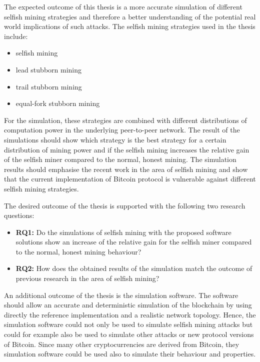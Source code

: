 The expected outcome of this thesis is a more accurate simulation of different selfish mining strategies and therefore a better understanding of the potential real world implications of such attacks.
The selfish mining strategies used in the thesis include:
\begin{itemize}
\item selfish mining \cite{eyal2014majority}
\item lead stubborn mining \cite{nayak2016stubborn}
\item trail stubborn mining \cite{nayak2016stubborn}
\item equal-fork stubborn mining \cite{nayak2016stubborn}
\end{itemize}

For the simulation, these strategies are combined with different distributions of computation power in the underlying peer-to-peer network.
The result of the simulations should show which strategy is the best strategy for a certain distribution of mining power and if the selfish mining increases the relative gain of the selfish miner compared to the normal, honest mining.
The simulation results should emphasise the recent work in the area of selfish mining and show that the current implementation of Bitcoin protocol is vulnerable against different selfish mining strategies.

The desired outcome of the thesis is supported with the following two research questions:

\begin{itemize}
	\item \textbf{RQ1:} Do the simulations of selfish mining with the proposed software solutions show an increase of the relative gain for the selfish miner compared to the normal, honest mining behaviour?

	\item \textbf{RQ2:} How does the obtained results of the simulation match the outcome of previous research in the area of selfish mining?
\end{itemize}


An additional outcome of the thesis is the simulation software.
The software should allow an accurate and deterministic simulation of the blockchain by using directly the reference implementation and a realistic network topology.
Hence, the simulation software could not only be used to simulate selfish mining attacks but could for example also be used to simulate other attacks or new protocol versions of Bitcoin. 
Since many other cryptocurrencies are derived from Bitcoin, they simulation software could be used also to simulate their behaviour and properties.
